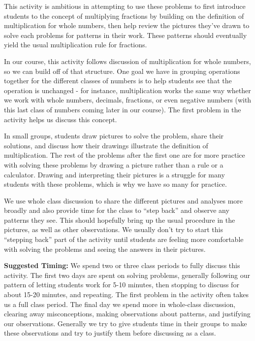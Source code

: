 \documentclass{ximera}
\begin{document}
\newpage
\begin{instructorNotes}
This activity is ambitious in attempting to use these problems to first introduce students to the concept of multiplying fractions by building on the definition of multiplication for whole numbers, then help review the pictures they've drawn to solve each problems for patterns in their work.  These patterns should eventually yield the usual multiplication rule for fractions.  

In our course, this activity follows discussion of multiplication for whole numbers, so we can build off of that structure.  One goal we have in grouping operations together for the different classes of numbers is to help students see that the operation is unchanged - for instance, multiplication works the same way whether we work with whole numbers, decimals, fractions, or even negative numbers (with this last class of numbers coming later in our course).  The first problem in the activity helps us discuss this concept.

In small groups, students draw pictures to solve the problem, share their solutions, and discuss how their drawings illustrate the definition of multiplication.  The rest of the problems after the first one are for more practice with solving these problems by drawing a picture rather than a rule or a calculator.  Drawing and interpreting their pictures is a struggle for many students with these problems, which is why we have so many for practice.

We use whole class discussion to share the different pictures and analyses more broadly and also provide time for the class to ``step back''  and observe any patterns they see.  This should hopefully bring up the usual procedure in the pictures, as well as other observations.  We usually don't try to start this ``stepping back'' part of the activity until students are feeling more comfortable with solving the problems and seeing the answers in their pictures.

{\bf Suggested Timing:} We spend two or three class periods to fully discuss this activity.  The first two days are spent on solving problems, generally following our pattern of letting students work for 5-10 minutes, then stopping to discuss for about 15-20 minutes, and repeating.  The first problem in the activity often takes us a full class period.  The final day we spend more in whole-class discussion, clearing away misconceptions, making observations about patterns, and justifying our observations.  Generally we try to give students time in their groups to make these observations and try to justify them before discussing as a class.
\end{instructorNotes}
\end{document}
